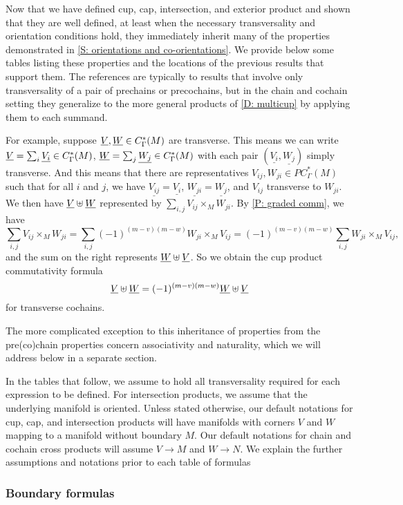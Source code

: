 Now that we have defined cup, cap, intersection, and exterior product and shown that they are well defined, at least when the necessary transversality and orientation conditions hold, they immediately inherit many of the properties demonstrated in \cref{S: orientations and co-orientations}.
We provide below some tables listing these properties and the locations of the previous results that support them.
The references are typically to results that involve only transversality of a pair of prechains or precochains, but in the chain and cochain setting they generalize to the more general products of \cref{D: multicup} by applying them to each summand.

For example, suppose $\underline{V}, \underline{W} \in C^*_\Gamma(M)$ are transverse.
This means we can write $\underline{V} = \sum_i \underline{V_i} \in C_\Gamma^*(M)$, $\underline{W} = \sum_j \underline{W_j} \in C_\Gamma^*(M)$ with each pair $(\underline{V_i},\underline{W_j})$ simply transverse.
And this means that there are representatives $V_{ij},W_{ji} \in PC_\Gamma^*(M)$ such that for all $i$ and $j$, we have $\underline{V_{ij}} = \underline{V_i}$, $\underline{W_{ji}} = \underline{W_j}$, and $V_{ij}$ transverse to $W_{ji}$.
We then have $\underline{V}\uplus \underline{W}$ represented by
$\sum_{i,j} V_{ij} \times_M W_{ji}$.
By \cref{P: graded comm}, we have
$$\sum_{i,j} V_{ij} \times_M W_{ji} = \sum_{i,j} (-1)^{(m-v)(m-w)}W_{ji} \times_M V_{ij} = (-1)^{(m-v)(m-w)}\sum_{i,j} W_{ji} \times_M V_{ij},$$
and the sum on the right represents $\underline{W}\uplus \underline{V}$.
So we obtain the cup product commutativity formula $$\underline{V}\uplus\underline{W} = (-1)^{(m-v)(m-w)}\underline{W}\uplus\underline{V}$$ for transverse cochains.

The more complicated exception to this inheritance of properties from the pre(co)chain properties concern associativity and naturality, which we will address below in a separate section.

In the tables that follow, we assume to hold all transversality required for each expression to be defined.
For intersection products, we assume that the underlying manifold is oriented.
Unless stated otherwise, our default notations for cup, cap, and intersection products will have manifolds with corners $V$ and $W$ mapping to a manifold without boundary $M$.
Our default notations for chain and cochain cross products will assume $V \to M$ and $W \to N$.
We explain the further assumptions and notations prior to each table of formulas

\subsubsection{Boundary formulas}

